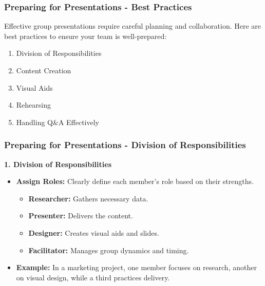 \documentclass[aspectratio=169]{beamer}
\begin{document}
\begin{frame}[fragile]
    \frametitle{Preparing for Presentations - Best Practices}
    Effective group presentations require careful planning and collaboration. Here are best practices to ensure your team is well-prepared:

    \begin{enumerate}
        \item Division of Responsibilities
        \item Content Creation
        \item Visual Aids
        \item Rehearsing
        \item Handling Q\&A Effectively
    \end{enumerate}
\end{frame}

\begin{frame}[fragile]
    \frametitle{Preparing for Presentations - Division of Responsibilities}
    \textbf{1. Division of Responsibilities}
    \begin{itemize}
        \item \textbf{Assign Roles:} Clearly define each member's role based on their strengths.
        \begin{itemize}
            \item \textbf{Researcher:} Gathers necessary data.
            \item \textbf{Presenter:} Delivers the content.
            \item \textbf{Designer:} Creates visual aids and slides.
            \item \textbf{Facilitator:} Manages group dynamics and timing.
        \end{itemize}
        \item \textbf{Example:} In a marketing project, one member focuses on research, another on visual design, while a third practices delivery.
    \end{itemize}
\end{frame}
\end{document}
